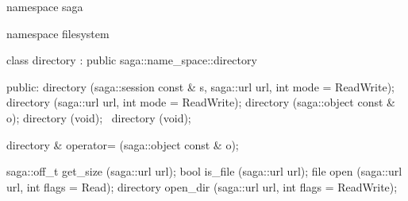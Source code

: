  \begin{mycode}[label=Prototype: saga::filesystem::directory]
  namespace saga 
  { 
    namespace filesystem 
    {
      class directory 
          : public saga::name_space::directory
      {
        public:
          directory (saga::session const & s, 
                     saga::url             url, 
                     int                   mode = ReadWrite);
          directory (saga::url             url, 
                     int                   mode = ReadWrite);
          directory (saga::object const &  o);
          directory (void);
         ~directory (void);
  
          directory & operator= (saga::object const & o);
  
          saga::off_t get_size (saga::url url);
          bool        is_file  (saga::url url);
          file        open     (saga::url url, 
                                int       flags = Read);
          directory   open_dir (saga::url url, 
                                int       flags = ReadWrite);
      }
    }
  }
  \end{mycode}

